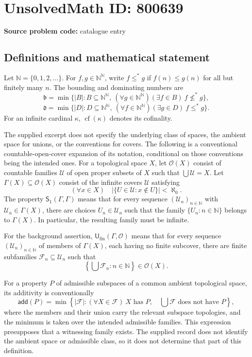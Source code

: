 \documentclass[11pt]{article}
\newcommand{\N}{\mathbb{N}}
\begin{document}
\section*{UnsolvedMath ID: 800639}
\textbf{Source problem code:} catalogue entry
\subsection{Definitions and mathematical statement}
Let \(\N=\{0,1,2,\ldots\}\). For \(f,g\in\N^{\N}\), write \(f\leq^{*}g\) if \(f(n)\leq g(n)\) for all but finitely many \(n\). The bounding and dominating numbers are
\[
\mathfrak b=\min\bigl\{|B|:B\subseteq\N^{\N},\ (\forall g\in\N^{\N})(\exists f\in B)\ f\not\leq^{*}g\bigr\},
\]
\[
\mathfrak d=\min\bigl\{|D|:D\subseteq\N^{\N},\ (\forall f\in\N^{\N})(\exists g\in D)\ f\leq^{*}g\bigr\}.
\]
For an infinite cardinal \(\kappa\), \(\operatorname{cf}(\kappa)\) denotes its cofinality.

The supplied excerpt does not specify the underlying class of spaces, the ambient space for unions, or the conventions for covers. The following is a conventional countable-open-cover expansion of its notation, conditional on those conventions being the intended ones. For a topological space \(X\), let \(\mathcal O(X)\) consist of countable families \(\mathcal U\) of open proper subsets of \(X\) such that \(\bigcup\mathcal U=X\). Let \(\Gamma(X)\subseteq\mathcal O(X)\) consist of the infinite covers \(\mathcal U\) satisfying
\[
(\forall x\in X)\quad \bigl|\{U\in\mathcal U:x\notin U\}\bigr|<\aleph_0.
\]
The property \(\mathsf S_1(\Gamma,\Gamma)\) means that for every sequence \((\mathcal U_n)_{n\in\N}\) with \(\mathcal U_n\in\Gamma(X)\), there are choices \(U_n\in\mathcal U_n\) such that the family \(\{U_n:n\in\N\}\) belongs to \(\Gamma(X)\). In particular, the resulting family must be infinite.

For the background assertion, \(\mathsf U_{\mathrm{fin}}(\Gamma,\mathcal O)\) means that for every sequence \((\mathcal U_n)_{n\in\N}\) of members of \(\Gamma(X)\), each having no finite subcover, there are finite subfamilies \(\mathcal F_n\subseteq\mathcal U_n\) such that
\[
\left\{\bigcup\mathcal F_n:n\in\N\right\}\in\mathcal O(X).
\]

For a property \(P\) of admissible subspaces of a common ambient topological space, its additivity is conventionally
\[
\mathsf{add}(P)=\min\left\{|\mathcal F|:(\forall X\in\mathcal F)\ X\text{ has }P,\quad \bigcup\mathcal F\text{ does not have }P\right\},
\]
where the members and their union carry the relevant subspace topologies, and the minimum is taken over the intended admissible families. This expression presupposes that a witnessing family exists. The supplied record does not identify the ambient space or admissible class, so it does not determine that part of this definition.
\end{document}
